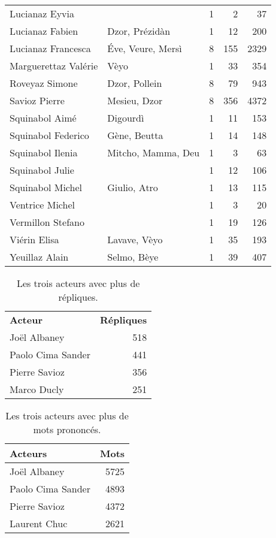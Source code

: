 \begin{longtable}{llrrr}
Lucianaz Eyvia & & 1 & 2 & 37\\
Lucianaz Fabien &Dzor, Prézidàn & 1 & 12 & 200\\
Lucianaz Francesca &Éve, Veure, Mersì & 8 & 155 & 2329\\
Marguerettaz Valérie &Vèyo & 1 & 33 & 354\\
Roveyaz Simone &Dzor, Pollein & 8 & 79 & 943\\
Savioz Pierre &Mesieu, Dzor & 8 & 356 & 4372\\
Squinabol Aimé &Digourdì & 1 & 11 & 153\\
Squinabol Federico &Gène, Beutta & 1 & 14 & 148\\
Squinabol Ilenia &Mitcho, Mamma, Deu & 1 & 3 & 63\\
Squinabol Julie & & 1 & 12 & 106\\
Squinabol Michel &Giulio, Atro & 1 & 13 & 115\\
Ventrice Michel & & 1 & 3 & 20\\
Vermillon Stefano & & 1 & 19 & 126\\
Viérin Elisa &Lavave, Vèyo & 1 & 35 & 193\\
Yeuillaz Alain &Selmo, Bèye & 1 & 39 & 407\\
\bottomrule
\end{longtable}
\begin{table}[]
\centering
\caption{Les trois acteurs avec plus de répliques.}
\begin{tabular}{l|r}
\toprule
\multicolumn{1}{l}{\textbf{Acteur}} & \textbf{Répliques} \\

\multicolumn{1}{l}{Joël Albaney} &518\\
\multicolumn{1}{l}{Paolo Cima Sander} &441\\
\multicolumn{1}{l}{Pierre Savioz} &356\\
\multicolumn{1}{l}{Marco Ducly} &251\\
\bottomrule
\end{tabular}%
\end{table}
\begin{table}[]
\centering
\caption{Les trois acteurs avec plus de mots prononcés.}
\begin{tabular}{l|r}
    \toprule
\multicolumn{1}{l}{\textbf{Acteurs}} & \textbf{Mots} \\
    \midrule
\multicolumn{1}{l}{Joël Albaney} &5725\\
\multicolumn{1}{l}{Paolo Cima Sander} &4893\\
\multicolumn{1}{l}{Pierre Savioz} &4372\\
\multicolumn{1}{l}{Laurent Chuc} &2621\\
\bottomrule
\end{tabular}%
\end{table}
